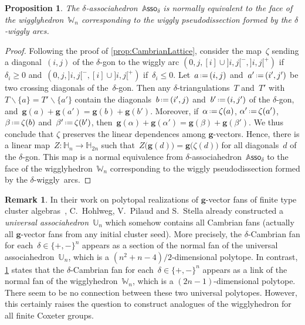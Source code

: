 \documentclass{amsart}
\newtheorem{proposition}[theorem]{Proposition}
\theoremstyle{definition}
\newtheorem{remark}[theorem]{Remark}
\newcommand{\HH}{\mathbb{H}} %
\renewcommand{\b}[1]{{\boldsymbol{#1}}} %
\newcommand{\ssm}{\smallsetminus} %
\newcommand{\eqdef}{\mbox{\,\raisebox{0.2ex}{\scriptsize\ensuremath{\mathrm:}}\ensuremath{=}\,}} %
\newcommand{\darkblue}{\color{darkblue}} %
\newcommand{\defn}[1]{\textsl{\darkblue #1}} %
\newcommand{\vincent}[1]{\todo[color=blue!30]{\rm #1 \\ \hfill --- V.}}
\newcommand{\polytope}[1]{\mathds{#1}} %
\newcommand{\wigglyhedron}{\polytope{W}} %
\newcommand{\Asso}{\polytope{A}\mathsf{sso}} %
\begin{document}
\begin{proposition}
\label{prop:CambrianFan}
The $\delta$-associahedron~$\Asso_\delta$ is normally equivalent to the face of the wigglyhedron~$\wigglyhedron_n$ corresponding to the wiggly pseudodissection formed by the $\delta$-wiggly arcs.
\end{proposition}

\begin{proof}
Following the proof of \cref{prop:CambrianLattice}, consider the map~$\zeta$ sending a diagonal~$(i,j)$ of the $\delta$-gon to the wiggly arc $(0, j, [i] \cup {]i,j[}^-, {]i,j[}^+)$ if~$\delta_i \ge 0$ and~$(0, j, {]i,j[}^-, [i] \cup {]i,j[}^+)$ if~$\delta_i \le 0$.
Let~$a \eqdef (i,j)$ and~$a' \eqdef (i',j')$ be two crossing diagonals of the~$\delta$-gon.
Then any $\delta$-triangulations~$T$ and~$T'$ with~$T \ssm \{a\} = T' \ssm \{a'\}$ contain the diagonals~$b \eqdef (i',j)$ and~$b' \eqdef (i,j')$ of the $\delta$-gon, and~$\b{g}(a) + \b{g}(a') = \b{g}(b) + \b{g}(b')$.
Moreover, if~$\alpha \eqdef \zeta(a)$, $\alpha' \eqdef \zeta(a')$, $\beta \eqdef \zeta(b)$ and~$\beta' \eqdef \zeta(b')$, then~$\b{g}(\alpha) + \b{g}(\alpha') = \b{g}(\beta) + \b{g}(\beta')$.
We thus conclude that $\zeta$ preserves the linear dependences among $\b{g}$-vectors.
Hence, there is a linear map~$Z : \HH_n \to \HH_{2n}$ such that~$Z \big( \b{g}(d) \big) = \b{g} \big( \zeta(d) \big)$ for all diagonals~$d$ of the $\delta$-gon.
This map is a normal equivalence from $\delta$-associahedron~$\Asso_\delta$ to the face of the wigglyhedron~$\wigglyhedron_n$ corresponding to the wiggly pseudodissection formed by the $\delta$-wiggly~arcs.
\end{proof}


\begin{remark}
In their work on polytopal realizations of $\b{g}$-vector fans of finite type cluster algebras~\cite{HohlwegPilaudStella}, C.~Hohlweg, V.~Pilaud and S.~Stella already constructed a \defn{universal associahedron}~$\polytope{U}_n$ which somehow contains all Cambrian fans (actually all $\b{g}$-vector fans from any initial cluster seed).
More precisely, the $\delta$-Cambrian fan for each~$\delta \in \{+,-\}^n$  appears as a section of the normal fan of the universal associahedron~$\polytope{U}_n$, which is a $(n^2+n-4)/2$-dimensional polytope.
In contrast, \cref{prop:CambrianFan} states that the $\delta$-Cambrian fan for each~$\delta \in \{+,-\}^n$ appears as a link of the normal fan of the wigglyhedron~$\wigglyhedron_n$, which is a $(2n-1)$-dimensional polytope.
There seem to be no connection between these two universal polytopes.
However, this certainly raises the question to construct analogues of the wigglyhedron for all finite Coxeter groups.
\end{remark}
\end{document}
